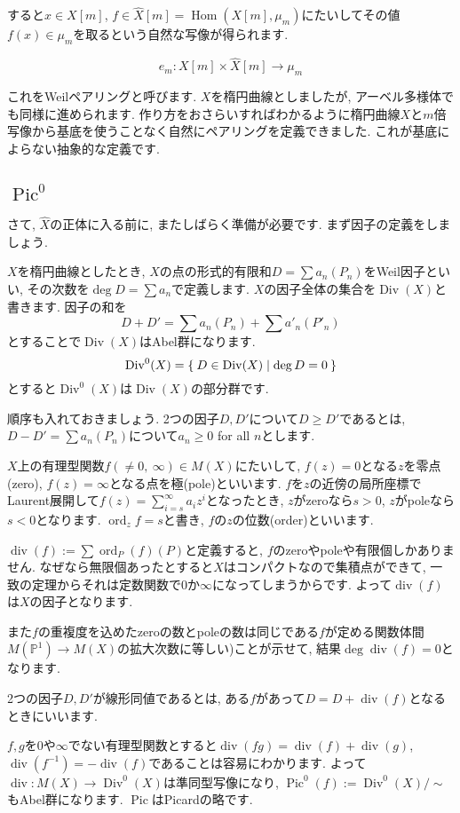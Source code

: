 \documentclass{jsarticle}
\newcommand{\PP}{\mathbb{P}}
\newcommand{\makeop}[1]{\mathop{\mathrm{#1}}\nolimits}
\def\Hom{\makeop{Hom}}
\def\Pic{\makeop{Pic}}
\def\Div{\makeop{Div}}
\def\div{\makeop{div}}
\def\ord{\makeop{ord}}
\theoremstyle{definition}
\numberwithin{theorem}{section}
\begin{document}
すると$x \in X[m]$, $f \in \hat{X}[m] = \Hom(X[m], \mu_m)$にたいしてその値$f(x) \in \mu_m$を取るという自然な写像が得られます.

\begin{equation*}
e_m: X[m] \times \hat{X}[m] \rightarrow \mu_m
\end{equation*}

これをWeilペアリングと呼びます. $X$を楕円曲線としましたが, アーベル多様体でも同様に進められます. 作り方をおさらいすればわかるように楕円曲線$X$と$m$倍写像から基底を使うことなく自然にペアリングを定義できました. これが基底によらない抽象的な定義です.

\subsection{$\Pic^0$}
さて, $\hat{X}$の正体に入る前に, またしばらく準備が必要です. まず因子の定義をしましょう.

$X$を楕円曲線としたとき, $X$の点の形式的有限和$D = \sum a_n(P_n)$をWeil因子といい, その次数を$\deg D = \sum a_n$で定義します. $X$の因子全体の集合を$\Div(X)$と書きます.
因子の和を
\[
D + D' = \sum a_n(P_n) + \sum a'_n (P'_n)
\]
とすることで$\Div(X)$はAbel群になります.
\[
\Div^0(X) = \Set{D \in \Div(X) | \deg D = 0}
\]
とすると$\Div^0(X)$は$\Div(X)$の部分群です.

順序も入れておきましょう. 2つの因子$D, D'$について$D \geq D'$であるとは, $D - D' = \sum a_n(P_n)$について$a_n \geq 0$ for all $n$とします.

$X$上の有理型関数$f(\neq 0,\ \infty) \in M(X)$にたいして, $f(z) = 0$となる$z$を零点(zero), $f(z) = \infty$となる点を極(pole)といいます. $f$を$z$の近傍の局所座標でLaurent展開して$f(z) = \sum_{i=s}^\infty a_iz^i$となったとき, $z$がzeroなら$s > 0$, $z$がpoleなら$s < 0$となります. $\ord_z f = s$と書き, $f$の$z$の位数(order)といいます.

$\div(f) := \sum \ord_P(f) (P)$と定義すると, $f$のzeroやpoleや有限個しかありません. なぜなら無限個あったとすると$X$はコンパクトなので集積点ができて, 一致の定理からそれは定数関数で0か$\infty$になってしまうからです. よって$\div(f)$は$X$の因子となります.

また$f$の重複度を込めたzeroの数とpoleの数は同じである$f$が定める関数体間$M(\PP^1) \rightarrow M(X)$の拡大次数に等しい)ことが示せて, 結果$\deg \div(f) = 0$となります.

2つの因子$D, D'$が線形同値であるとは, ある$f$があって$D = D + \div(f)$となるときにいいます.

$f, g$を0や$\infty$でない有理型関数とすると$\div(fg) = \div(f) + \div(g)$, $\div(f^{-1}) = -\div(f)$であることは容易にわかります. よって $\div: M(X) \rightarrow \Div^0(X)$は準同型写像になり, $\Pic^0(f) := \Div^0(X)/\sim$もAbel群になります. $\Pic$はPicardの略です.
\end{document}
